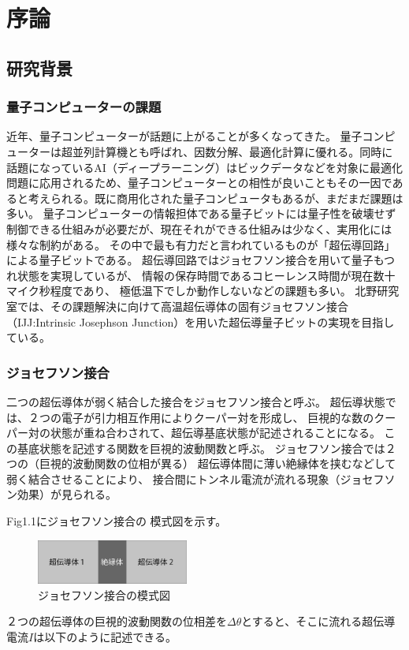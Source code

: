 \chapter{序論}


\section{研究背景}
\subsection*{量子コンピューターの課題}
近年、量子コンピューターが話題に上がることが多くなってきた。
量子コンピューターは超並列計算機とも呼ばれ、因数分解、最適化計算に優れる。同時に話題になっているAI（ディープラーニング）はビックデータなどを対象に最適化問題に応用されるため、量子コンピューターとの相性が良いこともその一因であると考えられる。既に商用化された量子コンピュータもあるが、まだまだ課題は多い。
量子コンピューターの情報担体である量子ビットには量子性を破壊せず制御できる仕組みが必要だが、現在それができる仕組みは少なく、実用化には様々な制約がある。
その中で最も有力だと言われているものが「超伝導回路」による量子ビットである。
超伝導回路ではジョセフソン接合を用いて量子もつれ状態を実現しているが、
情報の保存時間であるコヒーレンス時間が現在数十マイク秒程度であり、
極低温下でしか動作しないなどの課題も多い。
北野研究室では、その課題解決に向けて高温超伝導体の固有ジョセフソン接合
（IJJ:Intrinsic Josephson Junction）を用いた超伝導量子ビットの実現を目指している。

\subsection*{ジョセフソン接合}
二つの超伝導体が弱く結合した接合をジョセフソン接合と呼ぶ。
超伝導状態では、２つの電子が引力相互作用によりクーパー対を形成し、
巨視的な数のクーパー対の状態が重ね合わされて、超伝導基底状態が記述されることになる。
この基底状態を記述する関数を巨視的波動関数と呼ぶ。
ジョセフソン接合では２つの（巨視的波動関数の位相が異る）
超伝導体間に薄い絶縁体を挟むなどして弱く結合させることにより、
接合間にトンネル電流が流れる現象（ジョセフソン効果）が見られる。

Fig1.1にジョセフソン接合の
模式図を示す。
\vspace{5 mm}

\begin{figure}[h]
  \begin{center}
    \includegraphics[width=5cm]{./image/JJ.png}
    \caption{ジョセフソン接合の模式図}
    \label{fig:JJ}
  \end{center}
\end{figure}
２つの超伝導体の巨視的波動関数の位相差を$ \Delta \theta $とすると、そこに流れる超伝導電流$I$は以下のように記述できる。

